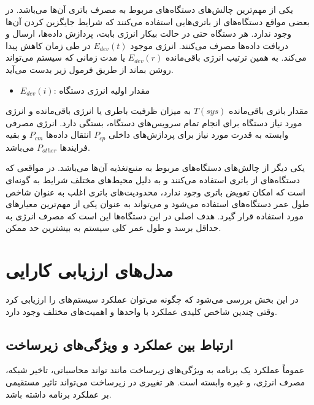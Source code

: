 یکی از مهم‌ترین چالش‌های دستگاه‌های  مربوط به مصرف باتری آن‌ها می‌باشد.
در بعضی مواقع دستگاه‌های  از باتری‌هایی استفاده می‌کنند که شرایط جایگزین
کردن آن‌ها وجود ندارد. هر دستگاه  حتی در حالت بیکار انرژی بابت، پردازش
داده‌ها، ارسال و دریافت داده‌ها مصرف می‌کنند. انرژی موجود $E_{dev}(t)$ در طی
زمان کاهش پیدا می‌کند. به همین ترتیب انرژی باقی‌مانده $E_{dev}(r)$ یا مدت زمانی
که سیستم می‌تواند روشن بماند از طریق فرمول زیر بدست می‌آید.


\begin{itemize}
    \item $E_{dev}(i)$: مقدار اولیه انرژی دستگاه
\end{itemize}

مقدار باتری باقی‌مانده $T(sys)$ به میزان ظرفیت باطری یا انرژی باقی‌مانده و انرژی
مورد نیاز دستگاه برای انجام تمام سرویس‌های دستگاه، بستگی دارد. انرژی مصرفی
وابسته به قدرت مورد نیاز برای پردازش‌های داخلی $P_{cp}$ انتقال داده‌ها $P_{cm}$
و بقیه فرایند‌ها $P_{other}$ می‌باشد.


یکی دیگر از چالش‌های دستگاه‌های  مربوط به منبع‌تغذیه آن‌ها می‌باشد. در
مواقعی که دستگاه‌های  از باتری استفاده می‌کنند و به دلیل محیط‌های مختلف
شرایط به گونه‌ای است که امکان تعویض باتری وجود ندارد، محدودیت‌های باتری اغلب به
عنوان شاخص طول عمر دستگاه‌های  استفاده می‌شود و می‌تواند به عنوان یکی از
مهم‌ترین معیار‌های  مورد استفاده قرار گیرد. هدف اصلی در این دستگاه‌ها
این است که مصرف انرژی به حداقل برسد و طول عمر کلی سیستم به بیشترین حد ممکن.

\section{مدل‌های ارزیابی کارایی}

در این بخش بررسی می‌شود که چگونه می‌توان عملکرد سیستم‌های  را ارزیابی
کرد وقتی چندین شاخص کلیدی عملکرد  با واحد‌ها و اهمیت‌های مختلف وجود
دارد.

\subsection{ارتباط بین عملکرد و ویژگی‌های زیرساخت }

عموماً عملکرد یک برنامه به ویژگی‌های زیرساخت  مانند تواند محاسباتی،
تاخیر شبکه، مصرف انرژی، و غیره وابسته است. هر تغییری در زیرساخت 
می‌تواند تاثیر مستقیمی بر عملکرد برنامه داشته باشد.

